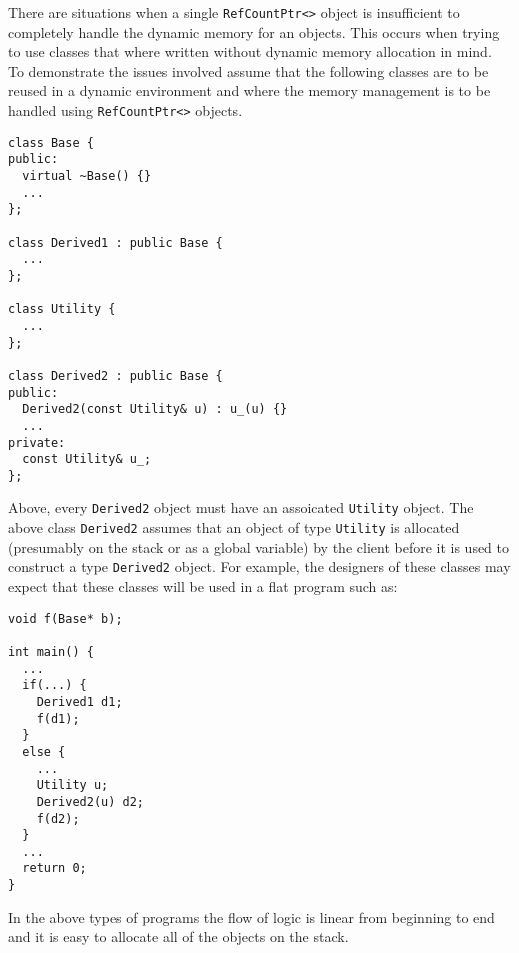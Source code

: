There are situations when a single {}\texttt{RefCountPtr<>} object is
insufficient to completely handle the dynamic memory for an objects.
This occurs when trying to use classes that where written without
dynamic memory allocation in mind.  To demonstrate the issues involved
assume that the following classes are to be reused in a dynamic
environment and where the memory management is to be handled using
{}\texttt{RefCountPtr<>} objects.
%
{\scriptsize\begin{verbatim}
class Base {
public:
  virtual ~Base() {}
  ...
};

class Derived1 : public Base {
  ...
};

class Utility {
  ...
};

class Derived2 : public Base {
public:
  Derived2(const Utility& u) : u_(u) {}
  ...
private:
  const Utility& u_;
};
\end{verbatim}}
%
\noindent{}
Above, every {}\texttt{Derived2} object must have an
assoicated {}\texttt{Utility} object.  The above class {}\texttt{Derived2}
assumes that an object of type {}\texttt{Utility} is allocated
(presumably on the stack or as a global variable) by the client before
it is used to construct a type {}\texttt{Derived2} object.  For example,
the designers of these classes may expect that these classes will be
used in a flat program such as:
%
{\scriptsize\begin{verbatim}
void f(Base* b);

int main() {
  ...
  if(...) {
    Derived1 d1;
    f(d1);
  }
  else {
    ...
    Utility u;
    Derived2(u) d2;
    f(d2);
  }
  ...
  return 0;
}
\end{verbatim}}
%
\noindent{}
In the above types of programs the flow of logic is linear
from beginning to end and it is easy to allocate all of the objects on
the stack.

